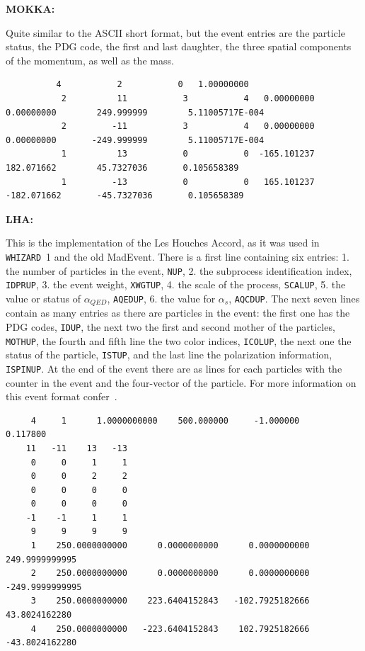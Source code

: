 \documentclass[12pt]{book}
\newcommand{\ttt}[1]{\texttt{#1}}
\newcommand{\whizard}{\texttt{WHIZARD}}
\begin{document}
{\bf MOKKA:}

Quite similar to the ASCII short format, but the event entries are the
particle status, the PDG code, the first and last daughter, the 
three spatial components of the momentum, as well as the mass.

\begin{scriptsize}
\begin{verbatim}
          4           2           0   1.00000000     
           2          11           3           4   0.00000000        0.00000000        249.999999        5.11005717E-004
           2         -11           3           4   0.00000000        0.00000000       -249.999999        5.11005717E-004
           1          13           0           0  -165.101237        182.071662        45.7327036       0.105658389     
           1         -13           0           0   165.101237       -182.071662       -45.7327036       0.105658389
\end{verbatim}
\end{scriptsize}

{\bf LHA:}

This is the implementation of the Les Houches Accord, as it was used
in \whizard\ 1 and the old MadEvent. There is a first line containing 
six entries: 1. the number of particles in the event, \ttt{NUP},
2. the subprocess identification index, \ttt{IDPRUP}, 3. the event
weight, \ttt{XWGTUP}, 4. the scale of the process, \ttt{SCALUP},
5. the value or status of $\alpha_{QED}$, \ttt{AQEDUP}, 6. the value
for $\alpha_s$, \ttt{AQCDUP}. The next seven lines contain as many
entries as there are particles in the event: the first one has the PDG
codes, \ttt{IDUP}, the next two the first and second mother of the particles,
\ttt{MOTHUP}, the fourth and fifth line the two color indices,
\ttt{ICOLUP}, the next one the status of the particle, \ttt{ISTUP},
and the last line the polarization information, \ttt{ISPINUP}. 
At the end of the event there are as lines for each particles with the
counter in the event and the four-vector of the particle. For more
information on this event format confer~\cite{LesHouches}.

\begin{scriptsize}
  \begin{verbatim}
     4     1      1.0000000000    500.000000     -1.000000      0.117800
    11   -11    13   -13
     0     0     1     1
     0     0     2     2
     0     0     0     0
     0     0     0     0
    -1    -1     1     1
     9     9     9     9
     1    250.0000000000      0.0000000000      0.0000000000    249.9999999995
     2    250.0000000000      0.0000000000      0.0000000000   -249.9999999995
     3    250.0000000000    223.6404152843   -102.7925182666     43.8024162280
     4    250.0000000000   -223.6404152843    102.7925182666    -43.8024162280    
  \end{verbatim}
\end{scriptsize}
\end{document}
